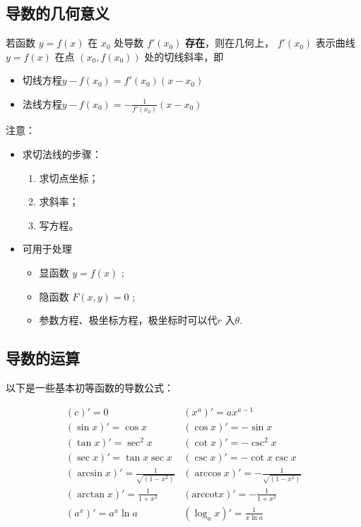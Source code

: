 \subsection{导数的几何意义}

若函数 $ y=f(x) $ 在 $ x_0 $ 处导数 $ f'(x_0) $ \textbf{存在}，则在几何上， $ f'(x_0) $ 表示曲线
$ y=f(x) $ 在点 $ (x_0,f(x_0)) $ 处的切线斜率，即\begin{itemize}
    \item 切线方程$ y-f(x_0)=f'(x_0)(x-x_0) $ 
    \item 法线方程$ y-f(x_0)=-\frac1{f'(x_0)}(x-x_0) $ 
\end{itemize}

注意：
\begin{itemize}
    \item 求切法线的步骤：\begin{enumerate}
        \item 求切点坐标；
        \item 求斜率；
        \item 写方程。
    \end{enumerate}
    \item 可用于处理\begin{itemize}
        \item 显函数 $ y=f(x) $ ;
        \item 隐函数 $ F(x,y)=0 $ ;
        \item 参数方程、极坐标方程，极坐标时可以代$ r $ 入$ \theta. $
    \end{itemize}
\end{itemize}

\subsection{导数的运算}

以下是一些基本初等函数的导数公式：

\begin{equation*}
    \begin{array}{ll}
        (c)'=0&(x^a)'=ax^{a-1}\\
        (\sin x)'=\cos x&(\cos x)'=-\sin x\\ 
        (\tan x)'=\sec^2 x&(\cot x)'=-\csc^2 x\\ 
        (\sec x)'=\tan x\sec x&(\csc x)'=-\cot x\csc x\\ 
        (\arcsin x)'=\frac{1}{\sqrt{(1-x^2)}}&(\arccos x)'=-\frac{1}{\sqrt{(1-x^2)}}\\
        (\arctan x)'=\frac1{1+x^2} & (\textrm{arccot} x)'=-\frac1{1+x^2}\\
        (a^x)'=a^x\ln a&(\log_a x)'=\frac1{x\ln a}\\
    \end{array}
\end{equation*}

